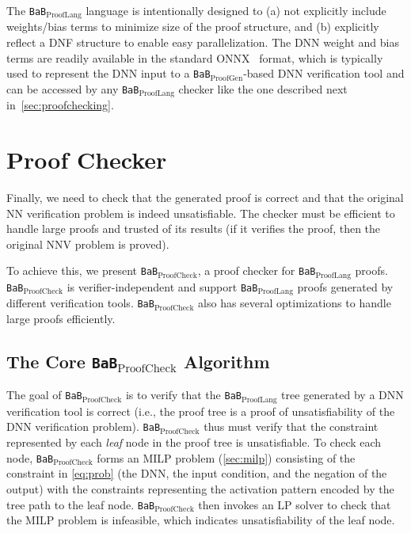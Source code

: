 \documentclass[oneside,11pt,dvipsnames]{book}
\numberwithin{equation}{section}
\theoremstyle{definition}
\theoremstyle{remark}
\newcommand{\proofgen}{\texttt{BaB$_{\text{ProofGen}}$}}
\newcommand{\prooflang}{\texttt{BaB$_{\text{ProofLang}}$}}
\newcommand{\proofcheck}{\texttt{BaB$_{\text{ProofCheck}}$}}
\begin{document}
The \prooflang{} language is intentionally designed to (a) not explicitly include weights/bias terms to minimize size of the proof structure, and (b) explicitly reflect a DNF structure to enable easy parallelization.
The DNN weight and bias terms are readily available in the standard ONNX~\cite{onnx} format, which is typically used to represent the DNN input to a \proofgen{}-based DNN verification tool and can be accessed by any \prooflang{} checker like the one described next in~\autoref{sec:proofchecking}.


\section{Proof Checker}\label{sec:proofchecking}
Finally, we need to check that the generated proof is correct and that the original NN verification problem is indeed unsatisfiable. The checker must be efficient to handle large proofs and trusted of its results (if it verifies the proof, then the original NNV problem is proved).


To achieve this, we present \proofcheck{}, a proof checker for \prooflang{} proofs.
\proofcheck{} is verifier-independent and support \prooflang{} proofs generated by different verification tools. \proofcheck{} also has several optimizations to handle large proofs efficiently.

\subsection{The Core \proofcheck{} Algorithm}


The goal of \proofcheck{} is to verify that the \prooflang{} tree generated by a DNN verification tool is correct (i.e., the proof tree is a proof of unsatisfiability of the DNN verification problem).
\proofcheck{} thus must verify that the constraint represented by each \emph{leaf} node in the proof tree is unsatisfiable. To check each node, \proofcheck{} forms an MILP problem (\autoref{sec:milp}) consisting of the constraint in \autoref{eq:prob} (the DNN, the input condition, and the negation of the output) with the constraints representing the activation pattern encoded by the tree path to the leaf node. \proofcheck{} then invokes an LP solver to check that the MILP problem is infeasible, which indicates unsatisfiability of the leaf node. 
\end{document}
